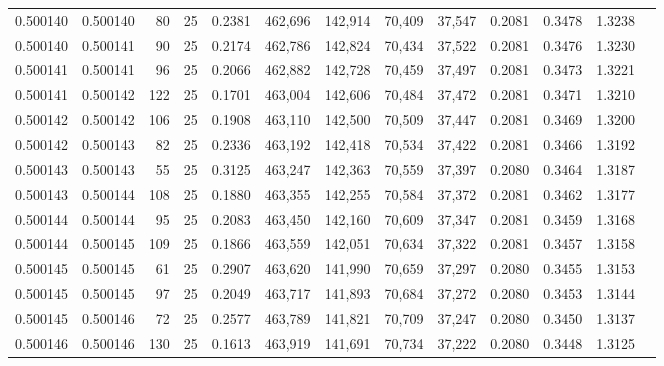 \begin{tabular}{rrrrrrrrrrrrr}
0.500140 & 0.500140 &  80 &  25 &                                     0.2381 & 462,696 & 142,914 &  70,409 &  37,547 & 0.2081 & 0.3478 & 1.3238 \\
0.500140 & 0.500141 &  90 &  25 &                                     0.2174 & 462,786 & 142,824 &  70,434 &  37,522 & 0.2081 & 0.3476 & 1.3230 \\
0.500141 & 0.500141 &  96 &  25 &                                     0.2066 & 462,882 & 142,728 &  70,459 &  37,497 & 0.2081 & 0.3473 & 1.3221 \\
0.500141 & 0.500142 & 122 &  25 &                                     0.1701 & 463,004 & 142,606 &  70,484 &  37,472 & 0.2081 & 0.3471 & 1.3210 \\
0.500142 & 0.500142 & 106 &  25 &                                     0.1908 & 463,110 & 142,500 &  70,509 &  37,447 & 0.2081 & 0.3469 & 1.3200 \\
0.500142 & 0.500143 &  82 &  25 &                                     0.2336 & 463,192 & 142,418 &  70,534 &  37,422 & 0.2081 & 0.3466 & 1.3192 \\
0.500143 & 0.500143 &  55 &  25 &                                     0.3125 & 463,247 & 142,363 &  70,559 &  37,397 & 0.2080 & 0.3464 & 1.3187 \\
0.500143 & 0.500144 & 108 &  25 &                                     0.1880 & 463,355 & 142,255 &  70,584 &  37,372 & 0.2081 & 0.3462 & 1.3177 \\
0.500144 & 0.500144 &  95 &  25 &                                     0.2083 & 463,450 & 142,160 &  70,609 &  37,347 & 0.2081 & 0.3459 & 1.3168 \\
0.500144 & 0.500145 & 109 &  25 &                                     0.1866 & 463,559 & 142,051 &  70,634 &  37,322 & 0.2081 & 0.3457 & 1.3158 \\
0.500145 & 0.500145 &  61 &  25 &                                     0.2907 & 463,620 & 141,990 &  70,659 &  37,297 & 0.2080 & 0.3455 & 1.3153 \\
0.500145 & 0.500145 &  97 &  25 &                                     0.2049 & 463,717 & 141,893 &  70,684 &  37,272 & 0.2080 & 0.3453 & 1.3144 \\
0.500145 & 0.500146 &  72 &  25 &                                     0.2577 & 463,789 & 141,821 &  70,709 &  37,247 & 0.2080 & 0.3450 & 1.3137 \\
0.500146 & 0.500146 & 130 &  25 &                                     0.1613 & 463,919 & 141,691 &  70,734 &  37,222 & 0.2080 & 0.3448 & 1.3125 \\

\end{tabular}
